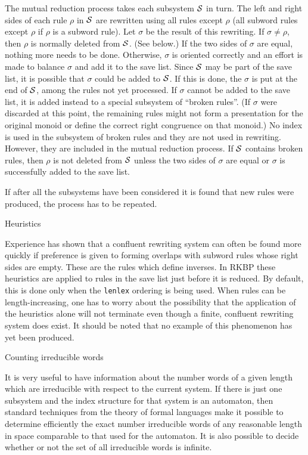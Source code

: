 The mutual reduction process takes each subsystem ${\cal S}$ in turn.
The left and right sides of each rule $\rho$ in ${\cal S}$ are
rewritten using all rules except $\rho$ (all subword rules except
$\rho$ if $\rho$ is a subword rule).  Let $\sigma$ be the result of
this rewriting.  If $\sigma \ne \rho$, then $\rho$ is normally deleted
from ${\cal S}$.  (See below.)  If the two sides of $\sigma$ are
equal, nothing more needs to be done.  Otherwise, $\sigma$ is oriented
correctly and an effort is made to balance $\sigma$ and add it to the
save list.  Since ${\cal S}$ may be part of the save list, it is
possible that $\sigma$ could be added to ${\cal S}$.  If this is done,
the $\sigma$ is put at the end of ${\cal S}$, among the rules not yet
processed.  If $\sigma$ cannot be added to the save list, it is added
instead to a special subsystem of ``broken rules''.  (If $\sigma$ were
discarded at this point, the remaining rules might not form a
presentation for the original monoid or define the correct right
congruence on that monoid.)  No index is used in the subsystem of
broken rules and they are not used in rewriting.  However, they are
included in the mutual reduction process.  If ${\cal S}$ contains
broken rules, then $\rho$ is not deleted from ${\cal S}$ unless the
two sides of $\sigma$ are equal or $\sigma$ is successfully added to
the save list.

If after all the subsystems have been considered it is found that new
rules were produced, the process has to be repeated.

\bigskip
{} Heuristics

\nobreak

Experience has shown that a confluent rewriting system can often be
found more quickly if preference is given to forming overlaps with
subword rules whose right sides are empty.  These are the rules which
define inverses.  In RKBP these heuristics are applied to rules in the
save list just before it is reduced.  By default, this is done only
when the {\tt lenlex} ordering is being used.  When rules can be
length-increasing, one has to worry about the possibility that the
application of the heuristics alone will not terminate even though a
finite, confluent rewriting system does exist.  It should be noted
that no example of this phenomenon has yet been produced.

\bigskip
{} Counting irreducible words

It is very useful to have information about the number words of a
given length which are irreducible with respect to the current system.
If there is just one subsystem and the index structure for that system
is an automaton, then standard techniques from the theory of formal
languages make it possible to determine efficiently the exact number
irreducible words of any reasonable length in space comparable to that
used for the automaton.  It is also possible to decide whether or not
the set of all irreducible words is infinite.

